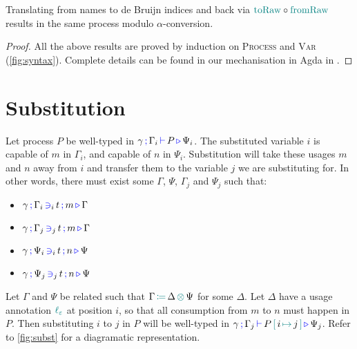 \begin{nilemma}
  Translating from names to de Bruijn indices and back via $\func{toRaw} \circ \func{fromRaw}$ results in the same process modulo $\alpha$-conversion.
\end{nilemma}

\begin{proof}[Proof]
  All the above results are proved by induction on \textsc{Process} and \textsc{Var} (\autoref{fig:syntax}).
  Complete details can be found in our mechanisation in Agda in \cite{Zalakain2020Agda}.
\end{proof}
  
\section{Substitution}
\label{app:substitution-generalization}

\begin{nitheorem}
  \label{thm:subst-generalization1}
  Let process $P$ be well-typed in $\types{\gamma}{\Gamma_i}{P}{\Psi_i}$.
  The substituted variable $i$ is capable of $m$ in $\Gamma_i$, and capable of $n$ in $\Psi_i$.
  Substitution will take these usages $m$ and $n$ away from $i$ and transfer them to the variable $j$ we are substituting for.
  In other words, there must exist some $\Gamma$, $\Psi$, $\Gamma_j$ and $\Psi_j$ such that:
  \begin{multicols}{2}
  \begin{itemize}
    \item $\contains{\gamma}{\Gamma_i}{i}{t}{m}{\Gamma}$
    \item $\contains{\gamma}{\Gamma_j}{j}{t}{m}{\Gamma}$
    \item $\contains{\gamma}{\Psi_i}{i}{t}{n}{\Psi}$
    \item $\contains{\gamma}{\Psi_j}{j}{t}{n}{\Psi}$
  \end{itemize}
  \end{multicols}
  Let $\Gamma$ and $\Psi$ be related such that $\opctx{\Gamma}{\Delta}{\Psi}$ for some $\Delta$.
  Let $\Delta$ have a usage annotation $\lz$ at position $i$, so that all consumption from $m$ to $n$ must happen in $P$.
  Then substituting $i$ to $j$ in $P$ will be well-typed in $\types{\gamma}{\Gamma_j}{\subst{P}{j}{i}}{\Psi_j}$.
  Refer to \autoref{fig:subst} for a diagramatic representation.
\end{nitheorem}

